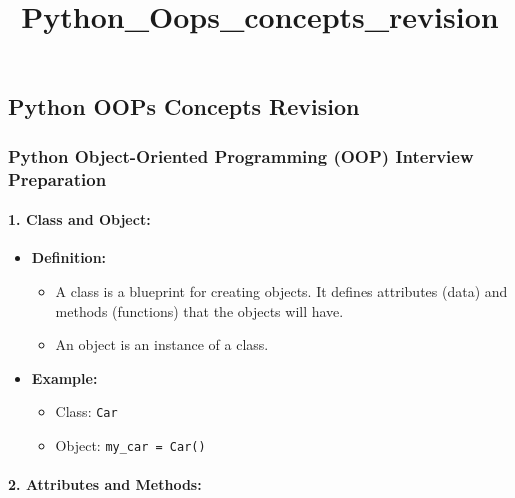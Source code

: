 \documentclass[11pt]{article}
\title{Python\_Oops\_concepts\_revision}
\providecommand{\tightlist}{%
      \setlength{\itemsep}{0pt}\setlength{\parskip}{0pt}}
\begin{document}
    
    \maketitle
    
    

    
    \subsection{Python OOPs Concepts
Revision}\label{python-oops-concepts-revision}

    \subsubsection{Python Object-Oriented Programming (OOP) Interview
Preparation}\label{python-object-oriented-programming-oop-interview-preparation}

\paragraph{\texorpdfstring{1. \textbf{Class and
Object:}}{1. Class and Object:}}\label{class-and-object}

\begin{itemize}
\tightlist
\item
  \textbf{Definition:}

  \begin{itemize}
  \tightlist
  \item
    A class is a blueprint for creating objects. It defines attributes
    (data) and methods (functions) that the objects will have.
  \item
    An object is an instance of a class.
  \end{itemize}
\item
  \textbf{Example:}

  \begin{itemize}
  \tightlist
  \item
    Class: \texttt{Car}
  \item
    Object: \texttt{my\_car\ =\ Car()}
  \end{itemize}
\end{itemize}

\paragraph{\texorpdfstring{2. \textbf{Attributes and
Methods:}}{2. Attributes and Methods:}}\label{attributes-and-methods}
\end{document}

